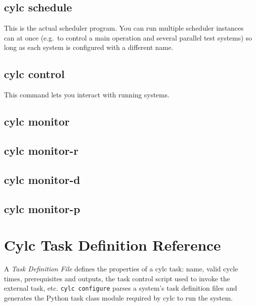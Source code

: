 \documentclass[11pt,a4paper]{article}
\begin{document}
{ \color{Magenta}
 
}

\pagebreak
\subsection{cylc schedule}

This is the actual scheduler program. You can run multiple scheduler
instances can at once (e.g.\ to control a main operation
and several parallel test systems) so long as each system is configured
with a different name. 
{
\color{Magenta}

}

\pagebreak
\subsection{cylc control}

This command lets you interact with running systems.

{
\color{Magenta}

}

\pagebreak
\subsection{cylc monitor}
{
\color{Magenta}

}

\subsection{cylc monitor-r}
{
\color{Magenta}

}

\subsection{cylc monitor-d}
{
\color{Magenta}

}

\subsection{cylc monitor-p}
{
\color{Magenta}

}

\pagebreak
\section{Cylc Task Definition Reference}

A {\em Task Definition File} defines the properties of a cylc task:
name, valid cycle times, prerequisites and outputs, the task
control script used to invoke the external task, etc.  
\verb=cylc configure= parses a system's task definition files and
generates the Python task class module required by cylc to run the system.
\end{document}
